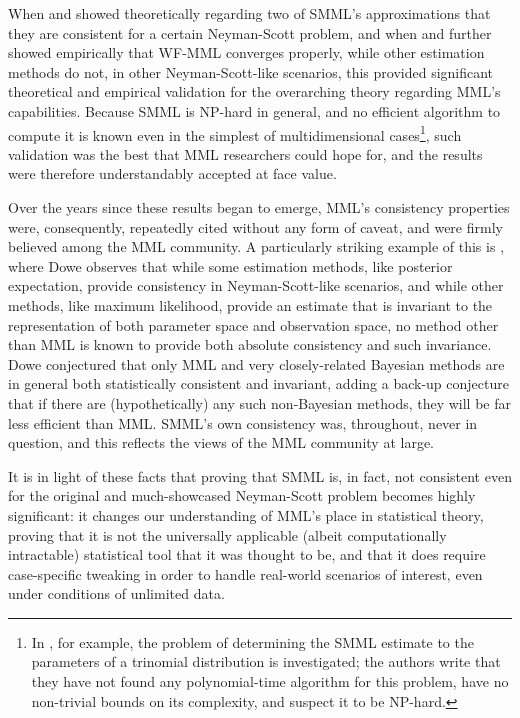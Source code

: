 \documentclass{IEEEtran}
\newcommand{\citet}[1]{\cite{#1}}
\begin{document}
When \cite{dowe1997resolving} and \cite{Wallace2005} showed theoretically
regarding two of SMML's
approximations that they are consistent for a certain Neyman-Scott problem,
and when \cite{dowe1996mml} and \cite{WallaceDowe1993} further showed
empirically that WF-MML converges
properly, while other estimation methods do not, in other Neyman-Scott-like
scenarios, this provided significant theoretical and empirical validation for
the overarching theory regarding MML's capabilities. Because SMML is NP-hard
in general, and no efficient algorithm to compute it is known
even in the simplest of multidimensional cases\footnote{In
\citet{farrwallace2002}, for example, the problem of determining the SMML
estimate to the parameters
of a trinomial distribution is investigated; the authors write that they
have not found any polynomial-time algorithm for this problem, have no
non-trivial bounds on its complexity, and suspect it to be
NP-hard.}, such validation
was the best that MML researchers could hope for, and the results were
therefore understandably accepted at face value.

Over the years since these results began to emerge, MML's consistency
properties were, consequently, repeatedly cited without any form of caveat,
and were firmly believed among the MML community. A particularly striking
example of this is \citet{dowe2011mml}, where Dowe observes
that while some estimation methods, like posterior expectation, provide
consistency in Neyman-Scott-like scenarios, and while other methods, like
maximum likelihood, provide an estimate that is invariant to the representation
of both parameter space and observation space, no method other than MML
is known to
provide both absolute consistency and such invariance. Dowe conjectured that
only MML and very closely-related Bayesian methods are in general both
statistically consistent and invariant, adding a back-up conjecture that
if there are (hypothetically) any such non-Bayesian methods, they will be
far less efficient than MML.
SMML's own consistency was, throughout, never in question, and this reflects
the views of the MML community at large.

It is in light of these facts that proving that SMML is, in fact, not
consistent even for the original and much-showcased Neyman-Scott problem
becomes highly significant: it changes our understanding of MML's place in
statistical theory, proving that it is not the universally applicable (albeit
computationally intractable) statistical tool that it was thought to be, and
that it does require case-specific tweaking in order to handle real-world
scenarios of interest, even under conditions of unlimited data.
\end{document}

